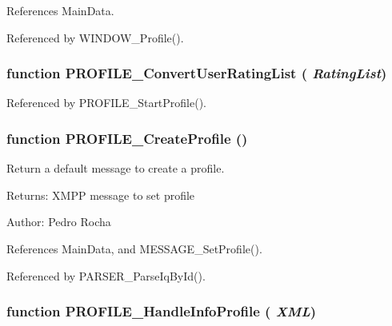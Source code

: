References MainData.

Referenced by WINDOW\_\-Profile().
\subsubsection[PROFILE\_\-ConvertUserRatingList]{\setlength{\rightskip}{0pt plus 5cm}function PROFILE\_\-ConvertUserRatingList ( {\em RatingList})}\label{profile_2profile_8js_8db7bd7d1fbf4271bb71a1cf00f94d29}




Referenced by PROFILE\_\-StartProfile().
\subsubsection[PROFILE\_\-CreateProfile]{\setlength{\rightskip}{0pt plus 5cm}function PROFILE\_\-CreateProfile ()}\label{profile_2profile_8js_ac998595adfe76da94a965aee7b76503}


Return a default message to create a profile. 

\begin{Desc}
\item[Returns:]XMPP message to set profile \end{Desc}
\begin{Desc}
\item[Author:]Pedro Rocha \end{Desc}


References MainData, and MESSAGE\_\-SetProfile().

Referenced by PARSER\_\-ParseIqById().
\subsubsection[PROFILE\_\-HandleInfoProfile]{\setlength{\rightskip}{0pt plus 5cm}function PROFILE\_\-HandleInfoProfile ( {\em XML})}\label{profile_2profile_8js_853546e8112fab89a1f1cc1e1736f6a3}


